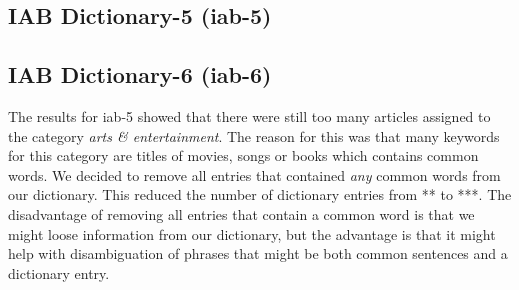\subsection{IAB Dictionary-5 (iab-5)}

\subsection{IAB Dictionary-6 (iab-6)}
The results for iab-5 showed that there were still too many articles assigned to the category \emph{arts \& entertainment}. The reason for this was that many keywords for this category are titles of movies, songs or books which contains common words. We decided to remove all entries that contained \emph{any} common words from our dictionary. This reduced the number of dictionary entries from ** to  ***.  The disadvantage of removing all entries that contain a common word is that we might loose information from our dictionary, but the advantage is that it might help with disambiguation of phrases that might be both common sentences and a dictionary entry. 

